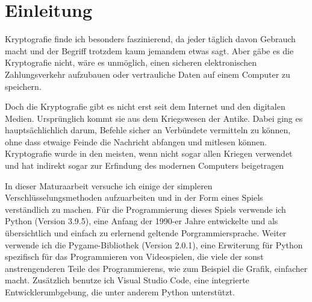 \section{Einleitung}

Kryptografie finde ich besonders faszinierend, da jeder täglich davon Gebrauch macht und der Begriff trotzdem kaum jemandem etwas sagt. Aber gäbe es die Kryptografie nicht, wäre es unmöglich, einen sicheren elektronischen Zahlungsverkehr aufzubauen oder vertrauliche Daten auf einem Computer zu speichern. 

Doch die Kryptografie gibt es nicht erst seit dem Internet und den digitalen Medien. Ursprünglich kommt sie aus dem Kriegswesen der Antike. Dabei ging es hauptsächlichlich darum, Befehle sicher an Verbündete vermitteln zu können, ohne dass etwaige Feinde die Nachricht abfangen und mitlesen können. Kryptografie wurde in den meisten, wenn nicht sogar allen Kriegen verwendet und hat indirekt sogar zur Erfindung des modernen Computers beigetragen

In dieser Maturaarbeit versuche ich einige der simpleren Verschlüsselungsmethoden aufzuarbeiten und in der Form eines Spiels verständlich zu machen. Für die Programmierung dieses Spiels verwende ich Python (Version 3.9.5), eine Anfang der 1990-er Jahre entwickelte und als übersichtlich und einfach zu erlernend geltende Porgrammiersprache. Weiter verwende ich die Pygame-Bibliothek (Version 2.0.1), eine Erwiterung für Python spezifisch für das Programmieren von Videospielen, die viele der sonst anstrengenderen Teile des Programmierens, wie zum Beispiel die Grafik, einfacher macht. Zusätzlich benutze ich Visual Studio Code, eine integrierte Entwicklerumbgebung, die unter anderem Python unterstützt.